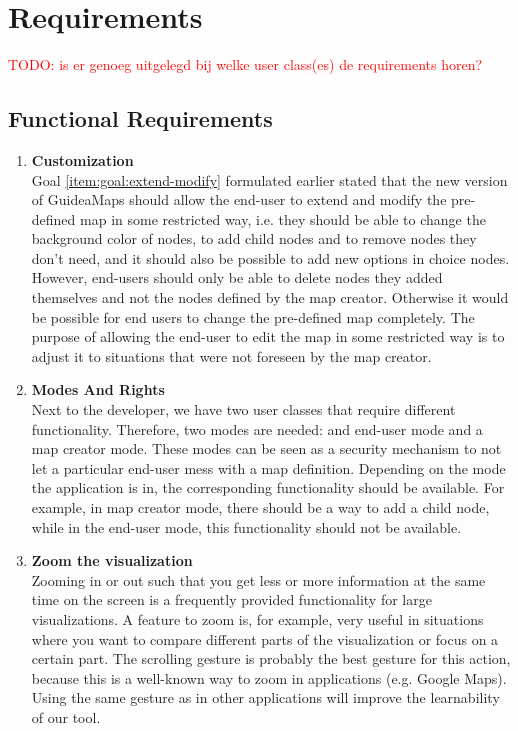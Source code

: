 \section{Requirements}\label{sec:requirements}
\textcolor{red}{TODO: is er genoeg uitgelegd bij welke user class(es) de requirements horen?}
\subsection{Functional Requirements}\label{sec:functional-requirements}

\begin{enumerate}[label=\textbf{\arabic*}., ref=\arabic*]
	
	\item \textbf{Customization\label{item:customization}} \hfill \\
	Goal \ref{item:goal:extend-modify} formulated earlier stated that the new version of GuideaMaps should allow the end-user to extend and modify the pre-defined map in some restricted way, i.e. they should be able to change the background color of nodes, to add child nodes and to remove nodes they don't need, and it should also be possible to add new options in choice nodes. However, end-users should only be able to delete nodes they added themselves and not the nodes defined by the map creator. Otherwise it would be possible for end users to change the pre-defined map completely. The purpose of allowing the end-user to edit the map in some restricted way is to adjust it to situations that were not foreseen by the map creator.
  
	\item \textbf{Modes And Rights\label{item:modes-rights}} \hfill \\
	Next to the developer, we have two user classes that require different functionality. Therefore, two modes are needed: and end-user mode and a map creator mode. These modes can be seen as a security mechanism to not let a particular end-user mess with a map definition. Depending on the mode the application is in, the corresponding functionality should be available. For example, in map creator mode, there should be a way to add a child node, while in the end-user mode, this functionality should not be available.
  
	\item \textbf{Zoom the visualization}\label{item:zoom} \hfill \\
	Zooming in or out such that you get less or more information at the same time on the screen is a frequently provided functionality for large visualizations. A feature to zoom is, for example, very useful in situations where you want to compare different parts of the visualization or focus on a certain part. The scrolling gesture is probably the best gesture for this action, because this is a well-known way to zoom in applications (e.g. Google Maps). Using the same gesture as in other applications will improve the learnability of our tool.
	

\end{enumerate}
